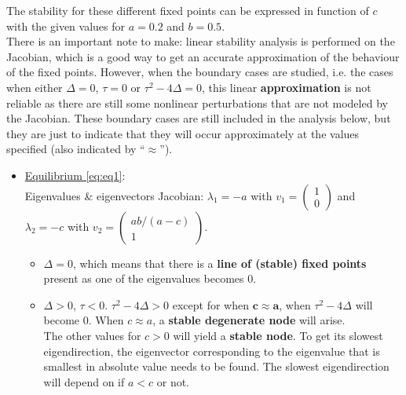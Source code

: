\documentclass[a4paper,11pt]{article}
\begin{document}
The stability for these different fixed points can be expressed in function of $c$ with the given values for $a=0.2$ and $b=0.5$.\\
There is an important note to make: linear stability analysis is performed on the Jacobian, which is a good way to get an accurate approximation of the behaviour
of the fixed points. However, when the boundary cases are studied, i.e. the cases when either $\Delta=0$, $\tau=0$ or $\tau^2-4\Delta=0$, this linear \textbf{approximation}
is not reliable as there are still some nonlinear perturbations that are not modeled by the Jacobian. These boundary cases are still included in the analysis below,
but they are just to indicate that they will occur approximately at the values specified (also indicated by ``$\approx$'').
\begin{itemize}
	\item \underline{Equilibrium \eqref{eq:eq1}}: \\ 
		Eigenvalues \& eigenvectors Jacobian: $\lambda_1=-a$ with $v_1=\begin{pmatrix}1\\0\end{pmatrix}$ and\\ $\lambda_2=-c$ with $v_2=\begin{pmatrix}ab/(a - c)\\1\end{pmatrix}$.
		\begin{itemize}
   			\item[\boxed{\mathbf{c\approx0}}  ] $\Delta=0$, which means that there is a \textbf{line of (stable) fixed points} present as one of the eigenvalues becomes 0.
      		\item[\boxed{\textbf{c>0}}  ] $\Delta>0$, $\tau<0$. $\tau^2-4\Delta>0$ except for when $\mathbf{c\approx a}$, when $\tau^2-4\Delta$ will become 0. When 
			  $c\approx a$, a \textbf{stable degenerate node} will arise.\\ The other values for $c>0$ will yield a \textbf{stable node}.
			  To get its slowest eigendirection, the eigenvector corresponding to the eigenvalue that is smallest in absolute value needs to be found.
			  The slowest eigendirection will depend on if $a<c$ or not.

\end{itemize}
\end{itemize}
\end{document}

